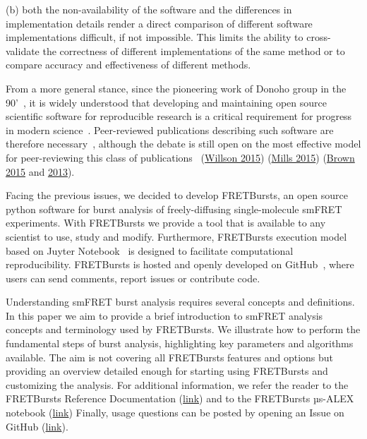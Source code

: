(b) both the non-availability of the software and the differences in implementation 
details render a direct comparison of different software implementations difficult, 
if not impossible. 
This limits the ability to cross-validate the correctness of different 
implementations of the same method or to compare accuracy and effectiveness
of different methods.

From a more general stance, since the pioneering work of Donoho group in the 90'~\cite{Buckheit_1995}, 
it is widely understood that developing and maintaining open source scientific software
for reproducible research is a critical requirement for progress in modern 
science~\cite{Ince_2012,Vihinen_2015}. Peer-reviewed publications describing such software are therefore necessary~\cite{Pradal_2013}, 
although the debate is still open on the most effective model for peer-reviewing this
class of publications~\cite{Check_Hayden_2013,Check_Hayden_2015} 
(\href{https://software-carpentry.org/blog/2015/04/quality-is-free-getting-there-isnt.html}{Willson 2015})
(\href{http://https://www.mozillascience.org/effective-code-review-for-journals}{Mills 2015})
(\href{http://http://ivory.idyll.org/blog/2015-we-live-in-a-bubble.html}{Brown 2015} and \href{http://http://ivory.idyll.org/blog/on-code-review-of-scientific-code.html}{2013}).

Facing the previous issues, we decided to develop FRETBursts, 
an open source python software for burst analysis of freely-diffusing
single-molecule smFRET experiments. 
With FRETBursts we provide a tool that is available to any scientist
to use, study and modify. Furthermore, FRETBursts execution model 
based on Juyter Notebook~\cite{Shen_2014} is designed to facilitate 
computational reproducibility. 
FRETBursts is hosted and openly developed on GitHub~\cite{Blischak_2016,Prli__2012}, 
where users can send comments, report issues or contribute code.

Understanding smFRET burst analysis requires several concepts and definitions.
In this paper we aim to provide a brief introduction to smFRET analysis concepts
and terminology used by FRETBursts. We illustrate how to perform
the fundamental steps of burst analysis, highlighting key parameters
and algorithms available. The aim is not covering all FRETBursts
features and options but providing an overview detailed enough for starting
using FRETBursts and customizing the analysis. For additional information, 
we refer the reader to the FRETBursts Reference Documentation
(\href{http://fretbursts.readthedocs.org/}{link}) and to
the FRETBursts µs-ALEX notebook
(\href{http://nbviewer.ipython.org/github/tritemio/FRETBursts\_notebooks/blob/master/notebooks/FRETBursts\%20-\%20us-ALEX\%20smFRET\%20burst\%20analysis.ipynb}{link})
Finally, usage questions can be posted by  opening an Issue
on GitHub (\href{https://github.com/tritemio/FRETBursts}{link}).


